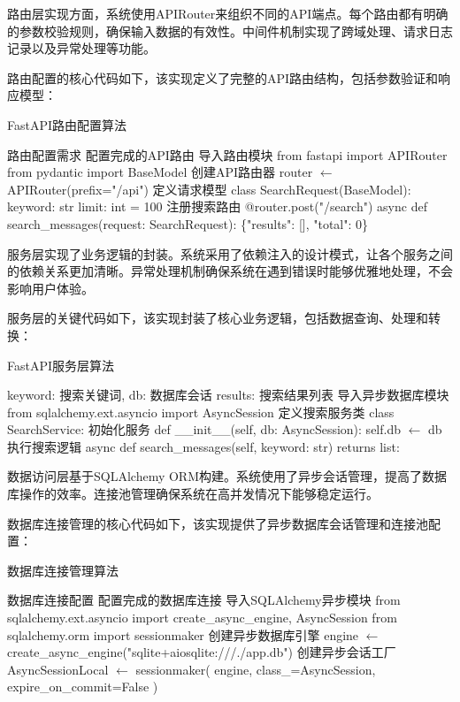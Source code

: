 路由层实现方面，系统使用APIRouter来组织不同的API端点。每个路由都有明确的参数校验规则，确保输入数据的有效性。中间件机制实现了跨域处理、请求日志记录以及异常处理等功能。

路由配置的核心代码如下，该实现定义了完整的API路由结构，包括参数验证和响应模型：

\begin{algorithm}[H]
\caption{FastAPI路由配置算法}
\begin{algorithmic}[1]
\REQUIRE 路由配置需求
\ENSURE 配置完成的API路由
\STATE 导入路由模块
\STATE from fastapi import APIRouter
\STATE from pydantic import BaseModel
\STATE 创建API路由器
\STATE router $\leftarrow$ APIRouter(prefix="/api")
\STATE 定义请求模型
\STATE class SearchRequest(BaseModel):
\STATE     keyword: str
\STATE     limit: int = 100
\STATE 注册搜索路由
\STATE @router.post("/search")
\STATE async def search\_messages(request: SearchRequest):
\STATE     \RETURN \{"results": [], "total": 0\}
\end{algorithmic}
\end{algorithm}

服务层实现了业务逻辑的封装。系统采用了依赖注入的设计模式，让各个服务之间的依赖关系更加清晰。异常处理机制确保系统在遇到错误时能够优雅地处理，不会影响用户体验。

服务层的关键代码如下，该实现封装了核心业务逻辑，包括数据查询、处理和转换：

\begin{algorithm}[H]
\caption{FastAPI服务层算法}
\begin{algorithmic}[1]
\REQUIRE keyword: 搜索关键词, db: 数据库会话
\ENSURE results: 搜索结果列表
\STATE 导入异步数据库模块
\STATE from sqlalchemy.ext.asyncio import AsyncSession
\STATE 定义搜索服务类
\STATE class SearchService:
\STATE     初始化服务
\STATE     def \_\_init\_\_(self, db: AsyncSession):
\STATE         self.db $\leftarrow$ db
\STATE     执行搜索逻辑
\STATE     async def search\_messages(self, keyword: str) returns list:
\STATE         \RETURN []
\end{algorithmic}
\end{algorithm}

数据访问层基于SQLAlchemy ORM构建。系统使用了异步会话管理，提高了数据库操作的效率。连接池管理确保系统在高并发情况下能够稳定运行。

数据库连接管理的核心代码如下，该实现提供了异步数据库会话管理和连接池配置：

\begin{algorithm}[H]
\caption{数据库连接管理算法}
\begin{algorithmic}[1]
\REQUIRE 数据库连接配置
\ENSURE 配置完成的数据库连接
\STATE 导入SQLAlchemy异步模块
\STATE from sqlalchemy.ext.asyncio import create\_async\_engine, AsyncSession
\STATE from sqlalchemy.orm import sessionmaker
\STATE 创建异步数据库引擎
\STATE engine $\leftarrow$ create\_async\_engine("sqlite+aiosqlite:///./app.db")
\STATE 创建异步会话工厂
\STATE AsyncSessionLocal $\leftarrow$ sessionmaker(
\STATE     engine, class\_=AsyncSession, expire\_on\_commit=False
\STATE )
\end{algorithmic}
\end{algorithm}

